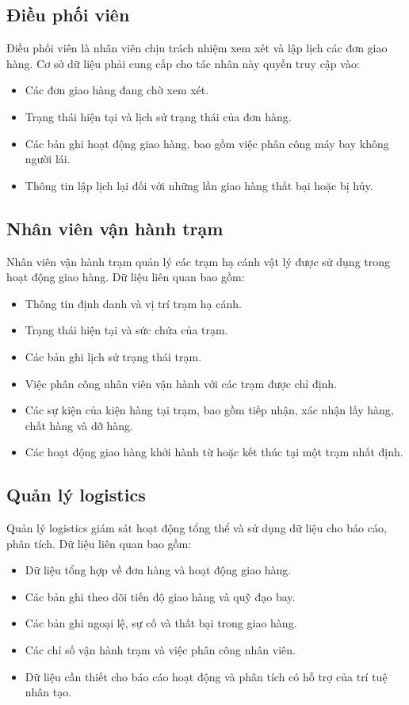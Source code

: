 \subsection{Điều phối viên}

Điều phối viên là nhân viên chịu trách nhiệm xem xét và lập lịch các đơn giao hàng. Cơ sở dữ liệu phải cung cấp cho tác nhân này quyền truy cập vào:
\begin{itemize}
    \item Các đơn giao hàng đang chờ xem xét.
    \item Trạng thái hiện tại và lịch sử trạng thái của đơn hàng.
    \item Các bản ghi hoạt động giao hàng, bao gồm việc phân công máy bay không người lái.
    \item Thông tin lập lịch lại đối với những lần giao hàng thất bại hoặc bị hủy.
\end{itemize}

\subsection{Nhân viên vận hành trạm}

Nhân viên vận hành trạm quản lý các trạm hạ cánh vật lý được sử dụng trong hoạt động giao hàng. Dữ liệu liên quan bao gồm:
\begin{itemize}
    \item Thông tin định danh và vị trí trạm hạ cánh.
    \item Trạng thái hiện tại và sức chứa của trạm.
    \item Các bản ghi lịch sử trạng thái trạm.
    \item Việc phân công nhân viên vận hành với các trạm được chỉ định.
    \item Các sự kiện của kiện hàng tại trạm, bao gồm tiếp nhận, xác nhận lấy hàng, chất hàng và dỡ hàng.
    \item Các hoạt động giao hàng khởi hành từ hoặc kết thúc tại một trạm nhất định.
\end{itemize}

\subsection{Quản lý logistics}

Quản lý logistics giám sát hoạt động tổng thể và sử dụng dữ liệu cho báo cáo, phân tích. Dữ liệu liên quan bao gồm:
\begin{itemize}
    \item Dữ liệu tổng hợp về đơn hàng và hoạt động giao hàng.
    \item Các bản ghi theo dõi tiến độ giao hàng và quỹ đạo bay.
    \item Các bản ghi ngoại lệ, sự cố và thất bại trong giao hàng.
    \item Các chỉ số vận hành trạm và việc phân công nhân viên.
    \item Dữ liệu cần thiết cho báo cáo hoạt động và phân tích có hỗ trợ của trí tuệ nhân tạo.
\end{itemize}

